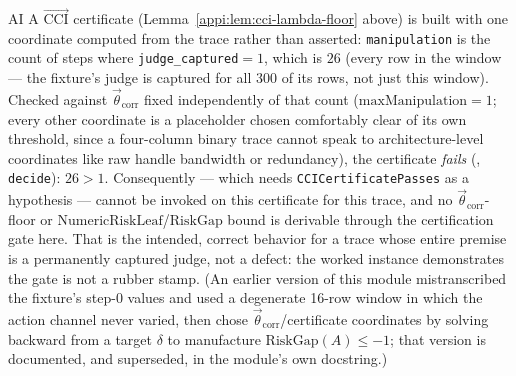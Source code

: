\begin{authbar}{AI}
A \(\vec{\mathrm{CCI}}\) certificate (Lemma~\ref{appi:lem:cci-lambda-floor} above) is built with one coordinate computed from the trace rather than asserted: \texttt{manipulation} is the count of steps where \texttt{judge\_captured}\(=1\), which is \(26\) (every row in the window --- the fixture's judge is captured for all 300 of its rows, not just this window). Checked against \(\vec{\theta}_{\mathrm{corr}}\) fixed independently of that count (\(\mathrm{maxManipulation}=1\); every other coordinate is a placeholder chosen comfortably clear of its own threshold, since a four-column binary trace cannot speak to architecture-level coordinates like raw handle bandwidth or redundancy), the certificate \emph{fails} (, \texttt{decide}): \(26>1\).
Consequently  --- which needs \texttt{CCICertificatePasses} as a hypothesis --- cannot be invoked on this certificate for this trace, and no \(\vec{\theta}_{\mathrm{corr}}\)-floor or \(\mathrm{NumericRiskLeaf}\)/\(\mathrm{RiskGap}\) bound is derivable through the certification gate here. That is the intended, correct behavior for a trace whose entire premise is a permanently captured judge, not a defect: the worked instance demonstrates the gate is not a rubber stamp. (An earlier version of this module mistranscribed the fixture's step-0 values and used a degenerate 16-row window in which the action channel never varied, then chose \(\vec{\theta}_{\mathrm{corr}}\)/certificate coordinates by solving backward from a target \(\delta\) to manufacture \(\mathrm{RiskGap}(A)\leq-1\); that version is documented, and superseded, in the module's own docstring.)


\end{authbar}

